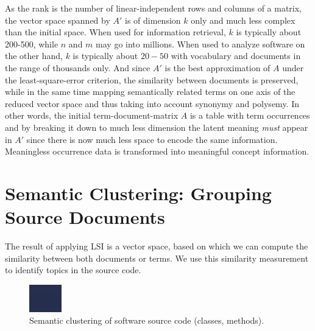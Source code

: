 As the rank is the number of linear-independent rows and columns of a matrix, the vector space spanned by $A'$ is of dimension $k$ only and much less complex than the initial space. When used for information retrieval, $k$ is typically about 200-500, while $n$ and $m$ may go into millions. When used to analyze software on the other hand, $k$ is typically about $20-50$ with vocabulary and documents in the range of thousands only. And since $A'$ is the best approximation of $A$ under the least-square-error criterion, the similarity between documents is preserved, while in the same time mapping semantically related terms on one axis of the reduced vector space and thus taking into account synonymy and polysemy. In other words, the initial term-document-matrix $A$ is a table with term occurrences and by breaking it down to much less dimension the latent meaning \emph{must} appear in $A'$ since there is now much less space to encode the same information. Meaningless occurrence data is transformed into meaningful concept information.

\section{Semantic Clustering: Grouping Source Documents}\label{sec:sekla}

The result of applying LSI is a vector space, based on which we can compute the similarity between both documents or terms. We use this similarity measurement to identify topics in the source code.

\begin{figure}[htb]
\begin{center}
\includegraphics[width=.8\columnwidth]{clustering}
\caption{Semantic clustering of software source code (\eg classes, methods).}
\label{fig:clustering}
\end{center}
\end{figure}

